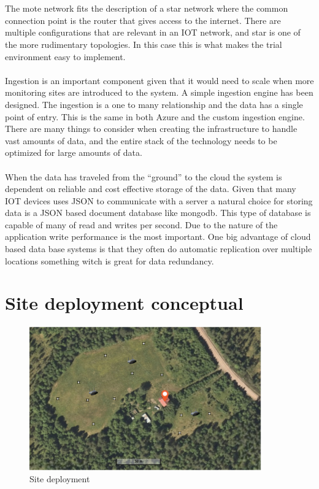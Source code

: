 \documentclass[]{uiophd}
\begin{document}
\\\\
The mote network fits the description of a star network where the common connection point is the router that gives access to the internet. There are multiple configurations that are relevant in an IOT network, and star is one of the more rudimentary topologies. In this case this is what makes the trial environment easy to implement.
\\\\
Ingestion is an important component given that it would need to scale when more monitoring sites are introduced to the system. A simple ingestion engine has been designed. The ingestion is a one to many relationship and the data has a single point of entry. This is the same in both Azure and the custom ingestion engine. There are many things to consider when creating the infrastructure to handle vast amounts of data, and the entire stack of the technology needs to be optimized for large amounts of data.
\\\\
 When the data has traveled from the “ground” to the cloud the system is dependent on reliable and cost effective storage of the data. Given that many IOT devices uses JSON to communicate with a server a natural choice for storing data is a JSON based document database like mongodb. This type of database is capable of many of read and writes per second. Due to the nature of the application write performance is the most important. One big advantage of cloud based data base systems is that they often do automatic replication over multiple locations something witch is great for data redundancy.
 
 \section{Site deployment conceptual}
 \begin{figure}[h]
\caption{Site deployment}
\centering
\includegraphics[width=10cm]{hjemly.png}
\end{figure}
\end{document}
